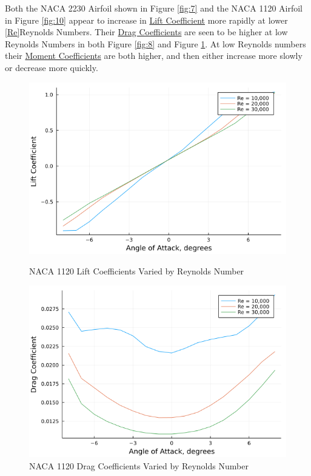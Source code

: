 \documentclass{article}
\begin{document}
Both the NACA 2230 Airfoil shown in Figure \ref{fig:7} and the NACA 1120 Airfoil in Figure \ref{fig:10} appear to increase in \hyperlink{CL}{Lift Coefficient} more rapidly at lower \ref{Re}{Reynolds Numbers}. Their \hyperlink{CD}{Drag Coefficients} are seen to be higher at low Reynolds Numbers in both Figure \ref{fig:8} and Figure \ref{fig:11}. At low Reynolds numbers their \hyperlink{CM}{Moment Coefficients} are both higher, and then either increase more slowly or decrease more quickly.

\begin{figure}[!htb]
  \includegraphics[width=\linewidth]{Figure10.png}
  \caption{NACA 1120 Lift Coefficients Varied by Reynolds Number}\label{fig:10}
\endminipage\hfill
{}
  \includegraphics[width=\linewidth]{Figure11.png}
  \caption{NACA 1120 Drag Coefficients Varied by Reynolds Number}\label{fig:11}

\end{figure}
\end{document}
